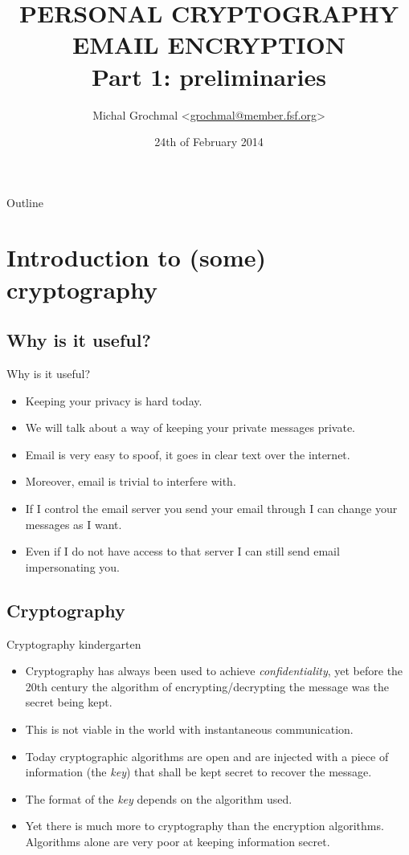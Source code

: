 \documentclass[hyperref={colorlinks=true}]{beamer}
\title[PERSONAL CRYPTOGRAPHY - EMAIL ENCRYPTION 1]{PERSONAL CRYPTOGRAPHY \\
                                                   EMAIL ENCRYPTION \\
                                                   Part 1: preliminaries}
\author{Michal Grochmal
  <\href{mailto:grochmal@member.fsf.org}{grochmal@member.fsf.org}>}
\institute{Queen Mary University of London}
\date{24th of February 2014}
\begin{document}
\begin{frame}
  \titlepage
\end{frame}

\begin{frame}{Outline}
  \tableofcontents[pausesections]
\end{frame}

\section{Introduction to (some) cryptography}

\subsection{Why is it useful?}
\begin{frame}{Why is it useful?}
  \begin{itemize}
    \item Keeping your privacy is hard today.
    \item We will talk about a way of keeping your private messages private.
    \item Email is very easy to spoof, it goes in clear text over the internet.
    \item Moreover, email is trivial to interfere with.
    \item If I control the email server you send your email through I can
change your messages as I want.
    \item Even if I do not have access to that server I can still send email
impersonating you.
  \end{itemize}
\end{frame}

\subsection{Cryptography}
\begin{frame}{Cryptography kindergarten}
  \begin{itemize}
    \item Cryptography has always been used to achieve \emph{confidentiality},
yet before the 20th century the algorithm of encrypting/decrypting the message
was the secret being kept.
    \item This is not viable in the world with instantaneous communication.
    \item Today cryptographic algorithms are open and are injected with a piece
of information (the \emph{key}) that shall be kept secret to recover the
message.
    \item The format of the \emph{key} depends on the algorithm used.
    \item Yet there is much more to cryptography than the encryption
algorithms.  Algorithms alone are very poor at keeping information secret.
  \end{itemize}
\end{frame}
\end{document}
